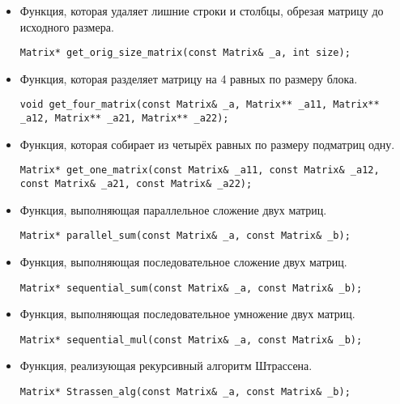 \documentclass{report}
\begin{document}
\begin{itemize}
, которая дополняет исходную марицу нулевыми строками и столбцами до размера, равного степени двойки.
\begin{lstlisting}
Matrix* get_square_matrix(const Matrix& _a, int size);
\end{lstlisting}
\item Функция, которая удаляет лишние строки и столбцы, обрезая матрицу до исходного размера.
\begin{lstlisting}
Matrix* get_orig_size_matrix(const Matrix& _a, int size);
\end{lstlisting}
\item Функция, которая разделяет матрицу на 4 равных по размеру блока.
\begin{lstlisting}
void get_four_matrix(const Matrix& _a, Matrix** _a11, Matrix** _a12, Matrix** _a21, Matrix** _a22);
\end{lstlisting}
\item Функция, которая собирает из четырёх равных по размеру подматриц одну.
\begin{lstlisting}
Matrix* get_one_matrix(const Matrix& _a11, const Matrix& _a12, const Matrix& _a21, const Matrix& _a22);
\end{lstlisting}
\item Функция, выполняющая параллельное сложение двух матриц.
\begin{lstlisting}
Matrix* parallel_sum(const Matrix& _a, const Matrix& _b);
\end{lstlisting}
\item Функция, выполняющая последовательное сложение двух матриц.
\begin{lstlisting}
Matrix* sequential_sum(const Matrix& _a, const Matrix& _b);
\end{lstlisting}
\item Функция, выполняющая последовательное умножение двух матриц.
\begin{lstlisting}
Matrix* sequential_mul(const Matrix& _a, const Matrix& _b);
\end{lstlisting}
\item Функция, реализующая рекурсивный алгоритм Штрассена.
\begin{lstlisting}
Matrix* Strassen_alg(const Matrix& _a, const Matrix& _b);
\end{lstlisting}
\end{itemize}

\newpage

\end{document}
